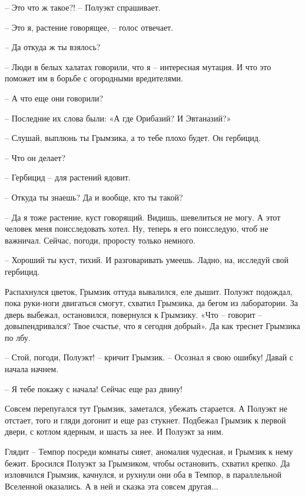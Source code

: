 \documentclass[ebook,oneside,final,openright]{memoir}
\begin{document}
\par
– Это что ж такое?! – Полуэкт спрашивает.\par
– Это я, растение говорящее, – голос отвечает.\par
– Да откуда ж ты взялось?\par
– Люди в белых халатах говорили, что я – интересная мутация. И что это поможет им в борьбе с огородными вредителями.\par
– А что еще они говорили?\par
– Последние их слова были: «А где Орибазий? И Эвтаназий?»\par
– Слушай, выплюнь ты Грымзика, а то тебе плохо будет. Он гербицид.\par
– Что он делает?\par
– Гербицид – для растений ядовит.\par
– Откуда ты знаешь? Да и вообще, кто ты такой?\par
– Да я тоже растение, куст говорящий. Видишь, шевелиться не могу. А этот человек меня поисследовать хотел. Ну, теперь я его поисследую, чтоб не важничал. Сейчас, погоди, проросту только немного.\par
– Хороший ты куст, тихий. И разговаривать умеешь. Ладно, на, исследуй свой гербицид.\par
\par
Распахнулся цветок, Грымзик оттуда вывалился, еле дышит. Полуэкт подождал, пока руки-ноги двигаться смогут, схватил Грымзика, да бегом из лаборатории. За дверь выбежал, остановился, повернулся к Грымзику. «Что – говорит – довыпендривался? Твое счастье, что я сегодня добрый». Да как треснет Грымзика по лбу.\par
\par
– Стой, погоди, Полуэкт! – кричит Грымзик. – Осознал я свою ошибку! Давай с начала начнем.\par
– Я тебе покажу с начала! Сейчас еще раз двину!\par
\par
Совсем перепугался тут Грымзик, заметался, убежать старается. А Полуэкт не отстает, того и гляди догонит и еще раз стукнет. Подбежал Грымзик к первой двери, с котлом ядерным, и шасть за нее. И Полуэкт за ним.\par
\par
Глядит – Темпор посреди комнаты сияет, аномалия чудесная, и Грымзик к нему бежит. Бросился Полуэкт за Грымзиком, чтобы остановить, схватил крепко. Да изловчился Грымзик, качнулся, и рухнули они оба в Темпор, в параллельной Вселенной оказались. А в ней и сказка эта совсем другая...\par
\end{document}
